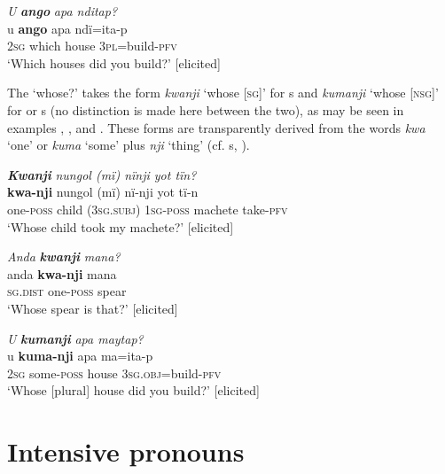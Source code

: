 \ea%
    \label{ex:pron:64}
          \textit{U} \textbf{\textit{ango}} \textit{apa nditap?}\\
\gll u    \textbf{ango}  apa    ndï=ita-p\\
    \textsc{2sg}  which  house  \textsc{3pl=}build-\textsc{pfv}\\
\glt `Which houses did you build?’ [elicited]
\z

  The   ‘whose?’ takes the form \textit{kwanji} ‘whose [\textsc{sg]}’ for  s and \textit{kumanji} ‘whose [\textsc{nsg]}’ for  or  s (no distinction is made here between the two), as may be seen in examples , , and . These forms are transparently derived from the words \textit{kwa} ‘one’ or \textit{kuma} ‘some’ plus \textit{nji} ‘thing’ (cf. s, ).


\ea%
    \label{ex:pron:65}
          \textbf{\textit{Kwanji}} \textit{nungol (mï) nïnji yot tïn?}\\
\gll \textbf{kwa-nji}  nungol  (mï)    nï-nji    yot      tï-n\\
    one-\textsc{poss}  child  (\textsc{3sg.subj)}  \textsc{1sg-poss}  machete  take-\textsc{pfv}\\
\glt `Whose child took my machete?’ [elicited]
\z

\ea%
    \label{ex:pron:66}
          \textit{Anda} \textbf{\textit{kwanji}} \textit{mana?}\\
\gll anda    \textbf{kwa-nji}  mana\\
    \textsc{sg.dist}  one\textsc{{}-poss} spear\\
\glt `Whose spear is that?’ [elicited]
\z

\ea%
    \label{ex:pron:67}
          \textit{U} \textbf{\textit{kumanji}} \textit{apa maytap?}\\
\gll u    \textbf{kuma{}-nji} apa    ma=ita-p\\
    \textsc{2sg}  some\textsc{{}-poss} house  \textsc{3sg.obj=}build-\textsc{pfv}\\
\glt `Whose [plural] house did you build?’ [elicited]
\z

\section{Intensive pronouns}\label{sec:6.6}

